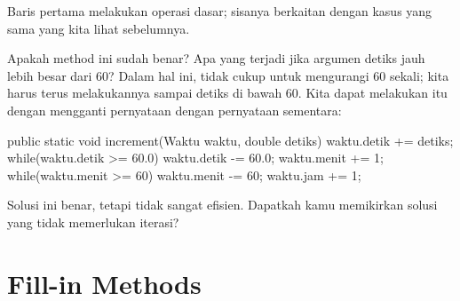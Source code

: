 Baris pertama melakukan operasi dasar; sisanya berkaitan dengan kasus yang sama yang kita lihat sebelumnya.

Apakah method ini sudah benar? Apa yang terjadi jika argumen detiks jauh lebih besar dari 60? Dalam hal ini, tidak cukup untuk mengurangi 60 sekali; kita harus terus melakukannya sampai detiks di bawah 60. Kita dapat melakukan itu dengan mengganti pernyataan dengan pernyataan sementara:

\newline

public static void increment(Waktu waktu, double detiks)\textbraceleft \newline
	waktu.detik += detiks; \newline
\newline
	while(waktu.detik \textgreater = 60.0)\textbraceleft \newline
		waktu.detik -= 60.0; \newline
		waktu.menit += 1; \newline
	\textbraceright \newline
\newline
	while(waktu.menit \textgreater = 60)\textbraceleft \newline
		waktu.menit -= 60; \newline
		waktu.jam += 1; \newline
	\textbraceright \newline
\textbraceright \newline

Solusi ini benar, tetapi tidak sangat efisien. Dapatkah kamu memikirkan solusi yang tidak memerlukan iterasi?

\section{Fill-in Methods}

